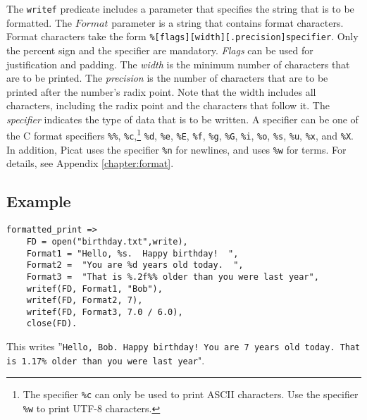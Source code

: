 The \texttt{writef} predicate includes a parameter that specifies the string that is to be formatted.  The $Format$ parameter is a string that contains format characters.  Format characters take the form \texttt{\%[flags][width][.precision]specifier}.  Only the percent sign and the specifier are mandatory.  \emph{Flags} can be used for justification and padding.  The \emph{width} is the minimum number of characters that are to be printed.  The \emph{precision} is the number of characters that are to be printed after the number's radix point.  Note that the width includes all characters, including the radix point and the characters that follow it.  The \emph{specifier} indicates the type of data that is to be written.  A specifier can be one of the C format specifiers \texttt{\%\%}, \texttt{\%c},\footnote{The specifier \texttt{\%c} can only be used to print ASCII characters. Use the specifier \texttt{\%w} to print UTF-8 characters.}  \texttt{\%d}, \texttt{\%e}, \texttt{\%E}, \texttt{\%f}, \texttt{\%g}, \texttt{\%G}, \texttt{\%i}, \texttt{\%o}, \texttt{\%s}, \texttt{\%u}, \texttt{\%x}, and \texttt{\%X}.  In addition, Picat uses the specifier \texttt{\%n} for newlines, and uses \texttt{\%w} for terms.  For details, see Appendix \ref{chapter:format}.

\subsection*{Example}
\begin{verbatim}
formatted_print =>
    FD = open("birthday.txt",write),
    Format1 = "Hello, %s.  Happy birthday!  ",
    Format2 =  "You are %d years old today.  ", 
    Format3 =  "That is %.2f%% older than you were last year",
    writef(FD, Format1, "Bob"),
    writef(FD, Format2, 7),
    writef(FD, Format3, 7.0 / 6.0),
    close(FD).
\end{verbatim}

This writes ''\texttt{Hello, Bob.  Happy birthday!  You are 7 years old today.  That is 1.17\% older than you were last year}".
    
